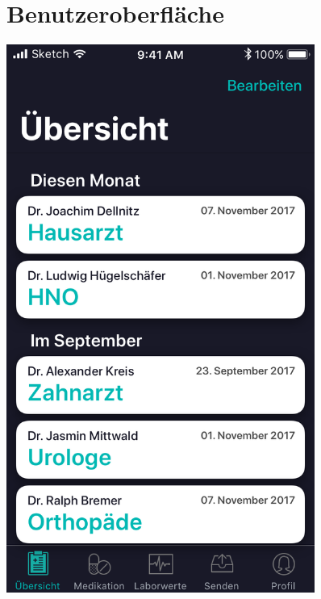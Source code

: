 \documentclass[a4paper]{scrreprt}
\begin{document}
\begin{figure}
\section{Benutzeroberfläche}


\captionsetup{singlelinecheck=false, justification = justified}
\begin{minipage}[t][][b]{0.4\textwidth}
\includegraphics[width=0.9\textwidth]{mockups/OverviewTab}
~\\

\end{minipage}
\end{figure}
\end{document}
